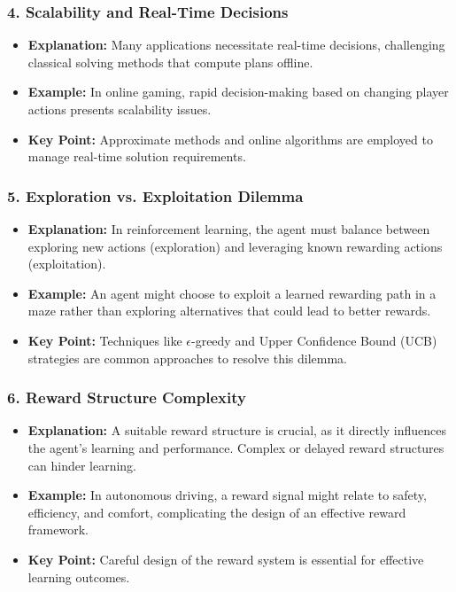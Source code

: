 \documentclass[aspectratio=169]{beamer}
\begin{document}
\begin{frame}[fragile]
    \frametitle{4. Scalability and Real-Time Decisions}
    \begin{itemize}
        \item \textbf{Explanation:} Many applications necessitate real-time decisions, challenging classical solving methods that compute plans offline.
        \item \textbf{Example:} In online gaming, rapid decision-making based on changing player actions presents scalability issues.
        \item \textbf{Key Point:} Approximate methods and online algorithms are employed to manage real-time solution requirements.
    \end{itemize}
\end{frame}

\begin{frame}[fragile]
    \frametitle{5. Exploration vs. Exploitation Dilemma}
    \begin{itemize}
        \item \textbf{Explanation:} In reinforcement learning, the agent must balance between exploring new actions (exploration) and leveraging known rewarding actions (exploitation).
        \item \textbf{Example:} An agent might choose to exploit a learned rewarding path in a maze rather than exploring alternatives that could lead to better rewards.
        \item \textbf{Key Point:} Techniques like $\epsilon$-greedy and Upper Confidence Bound (UCB) strategies are common approaches to resolve this dilemma.
    \end{itemize}
\end{frame}

\begin{frame}[fragile]
    \frametitle{6. Reward Structure Complexity}
    \begin{itemize}
        \item \textbf{Explanation:} A suitable reward structure is crucial, as it directly influences the agent's learning and performance. Complex or delayed reward structures can hinder learning.
        \item \textbf{Example:} In autonomous driving, a reward signal might relate to safety, efficiency, and comfort, complicating the design of an effective reward framework.
        \item \textbf{Key Point:} Careful design of the reward system is essential for effective learning outcomes.
    \end{itemize}
\end{frame}
\end{document}

